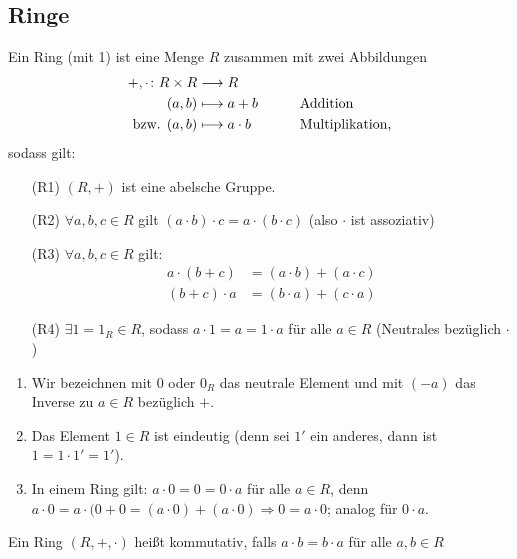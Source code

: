 \documentclass[12pt,a4paper]{scrartcl}
\begin{document}

\subsection{Ringe}
\begin{defi} Ein Ring (mit 1) ist eine Menge $R$ zusammen mit zwei Abbildungen
	\begin{alignat*}{2}
		+,\cdot \colon R\times R &\longrightarrow  R &&\quad\\
		(a,b)&\longmapsto a+b \qquad &&\text{Addition}\\
		\text{bzw. }(a,b)&\longmapsto a\cdot b &&\text{Multiplikation,}
	\end{alignat*}
sodass gilt:
\begin{itemize}
	\item[(R1)] $(R,+)$ ist eine abelsche Gruppe.
	\item[(R2)] $\forall a,b,c\in R$ gilt $(a\cdot b)\cdot c = a\cdot (b\cdot c)$ (also $\cdot$ ist assoziativ)
	\item[(R3)] $\forall a,b,c\in R$ gilt:
	\begin{equation*}
		\begin{aligned}
		a\cdot(b+c) &= (a\cdot b)+ (a\cdot c)\\
		(b+c)\cdot a &= (b\cdot a)+(c\cdot a)
		\end{aligned} \tag{Distributivität}
	\end{equation*}
	\item[(R4)] $\exists 1 = 1_R\in R$, sodass $a\cdot 1 = a = 1\cdot a$ für alle $a\in R$ (Neutrales bezüglich $\cdot$)
\end{itemize}
\end{defi}

\begin{bem} \leavevmode
	\begin{enumerate}
		\item Wir bezeichnen mit $0$ oder $0_R$ das neutrale Element und mit $(-a)$ das Inverse zu $a\in R$ bezüglich $+$.
		\item Das Element $1\in R$ ist eindeutig (denn sei $1'$ ein anderes, dann ist $1 = 1\cdot 1' = 1'$).
		\item In einem Ring gilt: $a\cdot 0 = 0 = 0\cdot a$ für alle $a\in R$, denn $a\cdot 0 = a\cdot (0+0 = (a\cdot 0)+(a\cdot 0)\Rightarrow 0 = a\cdot 0$; analog für $0\cdot a$.
	\end{enumerate}
\end{bem}

\begin{defi}
	Ein Ring $(R, +,\cdot)$ heißt kommutativ, falls $a\cdot b = b\cdot a$ für alle $a,b\in R$
\end{defi}	
\end{document}
